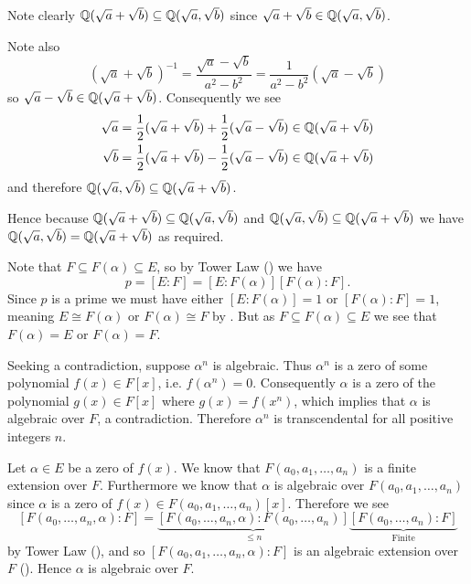 \begin{questions}
    \item Note clearly $\mathbb{Q}(\sqrt a + \sqrt b) \subseteq \mathbb{Q}(\sqrt a, \sqrt b)$ since $\sqrt a + \sqrt b \in \mathbb{Q}(\sqrt a, \sqrt b)$.
    
    Note also
    \[
        (\sqrt a + \sqrt b)^{-1} = \frac{\sqrt a - \sqrt b}{a^2 - b^2} = \frac1{a^2-b^2}\left(\sqrt a - \sqrt b\right)
    \]
    so $\sqrt a - \sqrt b \in \mathbb{Q}(\sqrt a + \sqrt b)$. Consequently we see
    \begin{align*}
        \sqrt a &= \frac12(\sqrt a + \sqrt b) + \frac12(\sqrt a - \sqrt b) \in \mathbb{Q}(\sqrt a + \sqrt b)\\
        \sqrt b &= \frac12(\sqrt a + \sqrt b) - \frac12(\sqrt a - \sqrt b) \in \mathbb{Q}(\sqrt a + \sqrt b)
    \end{align*}
    and therefore $\mathbb{Q}(\sqrt a, \sqrt b) \subseteq \mathbb{Q}(\sqrt a + \sqrt b)$.

    Hence because $\mathbb{Q}(\sqrt a + \sqrt b) \subseteq \mathbb{Q}(\sqrt a, \sqrt b)$ and $\mathbb{Q}(\sqrt a, \sqrt b) \subseteq \mathbb{Q}(\sqrt a + \sqrt b)$ we have $\mathbb{Q}(\sqrt a, \sqrt b) = \mathbb{Q}(\sqrt a + \sqrt b)$ as required.

    \item Note that $F \subseteq F(\alpha) \subseteq E$, so by Tower Law () we have
    \[
        p = [E:F] = [E:F(\alpha)][F(\alpha):F].
    \]
    Since $p$ is a prime we must have either $[E:F(\alpha)] = 1$ or $[F(\alpha):F] = 1$, meaning $E \cong F(\alpha)$ or $F(\alpha) \cong F$ by . But as $F \subseteq F(\alpha) \subseteq E$ we see that $F(\alpha) = E$ or $F(\alpha) = F$.
        
    \item Seeking a contradiction, suppose $\alpha^n$ is algebraic. Thus $\alpha^n$ is a zero of some polynomial $f(x) \in F[x]$, i.e. $f(\alpha^n) = 0$. Consequently $\alpha$ is a zero of the polynomial $g(x) \in F[x]$ where $g(x) = f(x^n)$, which implies that $\alpha$ is algebraic over $F$, a contradiction. Therefore $\alpha^n$ is transcendental for all positive integers $n$.

    \item \begin{partquestions}{\roman*}
        \item Let $\alpha \in E$ be a zero of $f(x)$. We know that $F(a_0, a_1, \dots, a_n)$ is a finite extension over $F$. Furthermore we know that $\alpha$ is algebraic over $F(a_0, a_1, \dots, a_n)$ since $\alpha$ is a zero of $f(x) \in F(a_0, a_1, \dots, a_n)[x]$. Therefore we see
        \[
            [F(a_0, \dots, a_n, \alpha):F] = \underbrace{[F(a_0, \dots, a_n, \alpha):F(a_0, \dots, a_n)]}_{\leq n}\underbrace{[F(a_0, \dots, a_n):F]}_{\text{Finite}}
        \]
        by Tower Law (), and so $[F(a_0, a_1, \dots, a_n, \alpha):F]$ is an algebraic extension over $F$ (). Hence $\alpha$ is algebraic over $F$.
        

\end{partquestions}
\end{questions}
